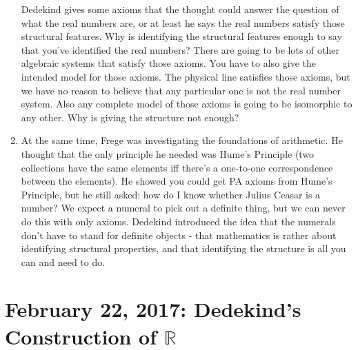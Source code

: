 \documentclass[12pt]{article}
\theoremstyle{definition}
\begin{document}
\begin{enumerate}
        Dedekind gives some axioms that the thought could answer the question
        of what the real numbers are, or at least he says the real numbers
        satisfy those structural features. Why is identifying the structural
        features enough to say that you've identified the real numbers? There
        are going to be lots of other algebraic systems that satisfy those
        axioms. You have to also give the intended model for those axioms. The
        physical line satisfies those axioms, but we have no reason to believe
        that any particular one is not the real number system. Also any
        complete model of those axioms is going to be isomorphic to any other.
        Why is giving the structure not enough?
    \item
        At the same time, Frege was investigating the foundations of
        arithmetic. He thought that the only principle he needed was Hume's
        Principle (two collections have the same elements iff there's a
        one-to-one correspondence between the elements). He showed you could
        get PA axioms from Hume's Principle, but he still asked: how do I know
        whether Julius Ceasar is a number? We expect a numeral to pick out a
        definite thing, but we can never do this with only axioms. Dedekind
        introduced the idea that the numerals don't have to stand for definite
        objects - that mathematics is rather about identifying structural
        properties, and that identifying the structure is all you can and need
        to do. 
\end{enumerate}

\section{February 22, 2017: Dedekind's Construction of $\mathbb{R}$}
\end{document}
